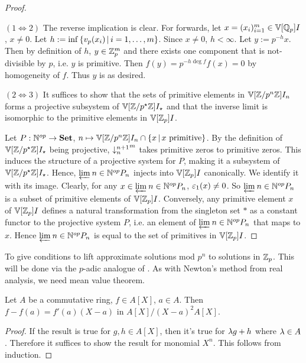 \begin{proof}~
  
  $(1\iff 2)$ The reverse implication is clear. 
  For forwards, let $x = (x_i)_{i = 1}^m \in \mathbb{V}[\mathbb{Q}_p]{I}$, $x \neq 0$. 
  Let $h := \inf\left\{v_p(x_i) \,|\, i = 1, \dots, m\right\}$.
  Since $x \neq 0$, $h < \infty$.
  Let $y := p^{-h}x$. 
  Then by definition of $h$, $y \in \mathbb{Z}_p^m$ and there exists one component 
  that is not-divisible by $p$, i.e. $y$ is primitive. 
  Then $f(y) = p^{-h\deg f}f(x) = 0$ by homogeneity of $f$. 
  Thus $y$ is as desired.
  
  $(2 \iff 3)$ It suffices to show that 
  the sets of primitive elements in $\mathbb{V}[\mathbb{Z}/p^n\mathbb{Z}]{I_n}$ forms a 
  projective subsystem of $\mathbb{V}[\mathbb{Z}/p^\star\mathbb{Z}]{I_\star}$ and that 
  the inverse limit is isomorphic to the primitive elements in $\mathbb{V}[\mathbb{Z}_p]{I}$.
  
  Let $P : \mathbb{N}^{op} \to \mathbf{Set}$, 
  $n \mapsto \mathbb{V}[\mathbb{Z}/p^n\mathbb{Z}]{I_n} \cap \left\{x \,|\, x \text{ primitive}\right\}$. 
  By the definition of $\mathbb{V}[\mathbb{Z}/p^\star\mathbb{Z}]{I_\star}$ being projective, 
  ${\downarrow_{n}^{n+1}}^m$ takes primitive zeros to primitive zeros.
  This induces the structure of a projective system for $P$,
  making it a subsystem of $\mathbb{V}[\mathbb{Z}/p^\star\mathbb{Z}]{I_\star}$.
  Hence, $\varprojlim_{{}}{n\in\mathbb{N}^{op}} P_n$ injects into $\mathbb{V}[\mathbb{Z}_p]{I}$ canonically. 
  We identify it with its image. 
  Clearly, for any $x \in \varprojlim_{{}}{n\in\mathbb{N}^{op}} P_n$, $\varepsilon_1(x) \neq 0$. 
  So $\varprojlim_{{}}{n\in\mathbb{N}^{op}} P_n$ is a subset of primitive elements of $\mathbb{V}[\mathbb{Z}_p]{I}$.
  Conversely, any primitive element $x$ of $\mathbb{V}[\mathbb{Z}_p]{I}$ defines 
  a natural transformation from the singleton set $*$ as a constant functor
  to the projective system $P$,
  i.e. an element of $\varprojlim_{{}}{n \in \mathbb{N}^{op}} P_n$ that maps to $x$. 
  Hence $\varprojlim_{{}}{n\in\mathbb{N}^{op}} P_n$ is equal to 
  the set of primitives in $\mathbb{V}[\mathbb{Z}_p]{I}$.
\end{proof}

\begin{rmk}
  
  To give conditions to lift approximate solutions mod $p^n$
  to solutions in $\mathbb{Z}_p$. 
  This will be done via the $p$-adic analogue of 
  .
  As with Newton's method from real analysis, 
  we need mean value theorem. 
\end{rmk}

\begin{prop}
  Let $A$ be a commutative ring, $f \in A[X]$, $a \in A$. 
  Then $f - f(a) = f'(a)(X - a)$ in $A[X]/(X-a)^2A[X]$. 
\end{prop}
\begin{proof}
  If the result is true for $g, h \in A[X]$,
  then it's true for $\lambda g + h$ where $\lambda \in A$. 
  Therefore it suffices to show the result for monomial $X^n$. 
  This follows from induction. 
\end{proof}

